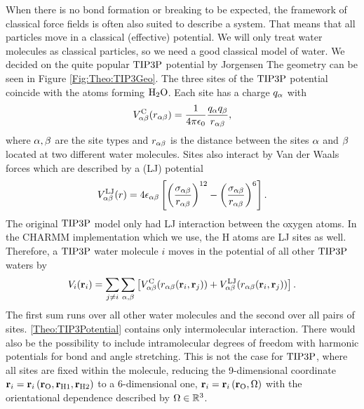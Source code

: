 When there is no bond formation or breaking to be expected, the framework of
classical force fields is often also suited to describe a system.
That means that
all particles move in a classical (effective) potential.
We will only treat water molecules as classical particles, so we need a good
classical model of water. We decided on the quite popular $\text{TIP3P}$ potential 
by Jorgensen \etal \cite{Jorgensen1983TIP3P} The geometry can be
seen in Figure \ref{Fig:Theo:TIP3Geo}. The three sites of the $\text{TIP3P}$ potential
coincide with the atoms forming $\text H _2 \text O$. Each site has a charge $q_{\alpha}$ with 
\begin{equation}
V^{\text C}_{\alpha\beta}(r_{\alpha\beta})=\frac{1}{4\pi\epsilon_0}\frac{q_{\alpha}q_{\beta}}{r_{\alpha\beta}},
\label{Theo:TIP3EC}
\end{equation}
where $\alpha,\beta$ are the site types and $r_{\alpha\beta}$ is the distance between
the sites $\alpha$ and $\beta$ located at two different water molecules. Sites also
interact by Van der Waals forces which are described by a 
(LJ) potential \newcommand\ELJ{\enmat V^{\te{LJ}}_{\al\be}}
\newcommand\salbe{\enmat{\si_{\al\be}}}
\newcommand\ealbe{\enmat{\eps_{\al\be}}}
\begin{equation}
\ELJ(r)=4\ealbe\ed{\rb{\frac{\salbe}{\ralbe}}^{12}-\rb{\frac{\salbe}{\ralbe}}^{6}}.
\label{Theo:TIP3ELJ}
\end{equation}
The original $\text{TIP3P}$ model only had LJ interaction between the oxygen atoms. In
the CHARMM implementation which we use, the H atoms are LJ
sites as well.\cite{CHARMM2009}
Therefore, a $\text{TIP3P}$ water molecule $i$ moves in the potential of all other $\text{TIP3P}$ waters by
\begin{equation}
V_i(\r_i)=\sum_{j\neq i} \sum_{\al,\be} \ed{\EC(\ralbe(\r_i,\r_j)) + \ELJ(\ralbe(\r_i,\r_j))}.
\label{Theo:TIP3Potential}
\end{equation}
The first sum runs over all other water molecules and the second over all
pairs of sites. \eqref{Theo:TIP3Potential} contains only
intermolecular interaction. There would also be the possibility to include intramolecular degrees of freedom with
harmonic potentials for bond and angle stretching. This is not the case for $\text{TIP3P}$,
where all sites are fixed within the molecule, reducing the 9-dimensional coordinate
\mbox{$\mathbf{r}_i=\mathbf{r}_i\left({\mathbf{r}_{\text O},\mathbf{r}_{\text H1},\mathbf{r}_{\text H2}}\right)$} to a 6-dimensional one, \mbox{$\mathbf{r}_i=\mathbf{r}_i\left({\mathbf{r}_{\text O},\Omega}\right)$}
with the orientational dependence described by $\Omega\in\mathbb{R}^3$.


